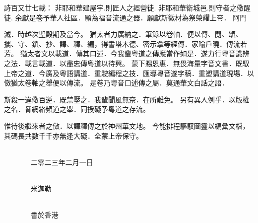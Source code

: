 \documentclass{book}
\begin{document}
\begin{sloppypar}
\begin{paracol}{3}
 \centerfont 詩百又廿七載：
 \centerfont 非耶和華建屋宇.則匠人之經營徒.
 \centerfont 非耶和華衛城邑.則守者之儆醒徒.
 \centerfont 余獻是卷予華人社區．願為福音流通之器．願獻斯微材為祭榮耀上帝．
 \centerfont 阿門

\switchcolumn

\fontsize{11}{13}\rightfont \Large 滅．時越次聖殿期及當今。 \rightfont 猶太者力廣納之．筆錄以卷軸．便以傳、閱、頌、攜、守、鎖、抄、譯、釋、編，得書塔木德、密示拿等經傳．家喻戶曉．傳流若芳。 \rightfont 猶太者文以載道．傳其口述．今我輩粵道之傳應當作如是．遂力行粵音識辨之法．載言載道．以盡忠傳粵道以待興。 \rightfont 蒙下賜恩惠．無畏海量字音文書．既馭上帝之道．今廣及粵語講道．重駛編程之技．匯導粵音遂字稿．重塑講道現場．以傚猶太卷軸之舉便以傳流。 \rightfont 是卷乃粵音口述傳之屬．莫通華文白話之語．

\end{paracol}

\begin{paracol}{2}\fontsize{11}{13}\leftfont \Large {} \leftfont 斯殺一違儆百逆．既禁壓之．我輩聞風無奈．在所難免。 \leftfont 另有異人例乎．以版權之名．脅網絡頻道之舉．同授礙予粵道之存流。

\switchcolumn

\fontsize{11}{13}\rightfont \Large 惟待後繼來者之傚．以譯釋傳之於神州華文地。 \rightfont 今能排程驅馭圖靈以編彙文檔，其碼長共數千千亦無逢大礙．全蒙上帝保守。

\end{paracol}



\begin{paracol}{1}

\fontsize{11}{13}\rightfont \Large
~~~~~~~~~~~~~~~~~~~~~~~~~~~~~~~~~~~~~~~~~~~~~~~~~~~~~~~~~~~~~~~~~~~~~~~~~~~~~~~ \rightfont 二零二三年二月一日

~~~~~~~~~~~~~~~~~~~~~~~~~~~~~~~~~~~~~~~~~~~~~~~~~~~~~~~~~~~~~~~~~~~~~~~~~~~~~~~ \rightfont 米迦勒

~~~~~~~~~~~~~~~~~~~~~~~~~~~~~~~~~~~~~~~~~~~~~~~~~~~~~~~~~~~~~~~~~~~~~~~~~~~~~~~ \rightfont 書於香港

\end{paracol}

\end{sloppypar}
\end{document}
